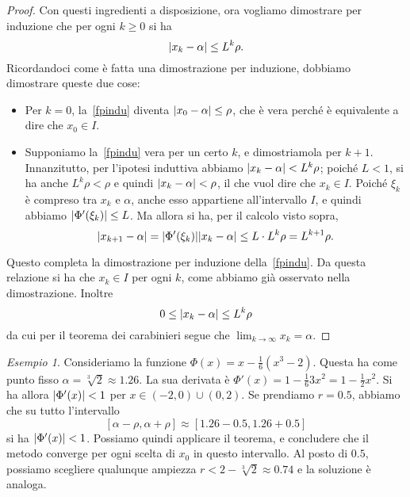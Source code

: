 \documentclass[a4paper]{report}
\DeclarePairedDelimiter{\abs}{\lvert}{\rvert}
\theoremstyle{definiton}
\theoremstyle{remark}
\newtheorem{esempio}[theorem]{Esempio}
\begin{document}
\begin{proof}
Con questi ingredienti a disposizione, ora vogliamo dimostrare per induzione che per ogni $k\geq 0$ si ha
\begin{equation} \label{fpindu}
    \abs{x_k - \alpha} \leq L^k \rho.
\end{equation}
Ricordandoci come è fatta una dimostrazione per induzione, dobbiamo dimostrare queste due cose:
\begin{itemize}
    \item Per $k=0$, la~\eqref{fpindu} diventa $\abs{x_0 - \alpha} \leq \rho$, che è vera perché è equivalente a dire che $x_0 \in I$. 
    \item Supponiamo la~\eqref{fpindu} vera per un certo $k$, e dimostriamola per $k+1$. Innanzitutto, per l'ipotesi induttiva abbiamo $\abs{x_k - \alpha} < L^k \rho$; poiché $L<1$, si ha anche $L^k\rho < \rho$ e quindi $\abs{x_k - \alpha}<\rho$, il che vuol dire che $x_k\in I$. Poiché $\xi_k$ è compreso tra $x_k$ e $\alpha$, anche esso appartiene all'intervallo $I$, e quindi abbiamo $\abs{\Phi'(\xi_k)} \leq L$. Ma allora si ha, per il calcolo visto sopra, 
    \begin{equation} \label{fpindu2}
        \abs{x_{k+1} - \alpha} = \abs{\Phi'(\xi_k)} \abs{x_k - \alpha} \leq L \cdot L^k \rho = L^{k+1}\rho.
    \end{equation}  
\end{itemize}
Questo completa la dimostrazione per induzione della~\eqref{fpindu}. Da questa relazione si ha che $x_k \in I$ per ogni $k$, come abbiamo già osservato nella dimostrazione. Inoltre
\[
0 \leq \abs{x_k - \alpha} \leq L^k \rho
\]
da cui per il teorema dei carabinieri segue che $\lim_{k\to \infty} x_k = \alpha$.
\end{proof}

\begin{esempio}
Consideriamo la funzione $\Phi(x) = x - \frac16 (x^3-2)$. Questa ha come punto fisso $\alpha =\sqrt[3]{2} \approx 1.26$. La sua derivata è $\Phi'(x) = 1 - \frac{1}{6}3x^2 = 1 - \frac{1}{2}x^2$. Si ha allora $\abs{\Phi'(x)}<1$ per $x \in (-2,0) \cup (0,2)$. Se prendiamo $r = 0.5$, abbiamo che su tutto l'intervallo
\[
    [\alpha-\rho,\alpha+\rho] \approx [1.26-0.5,1.26+0.5]
\]
si ha $\abs{\Phi'(x)}<1$. Possiamo quindi applicare il teorema, e concludere che il metodo converge per ogni scelta di $x_0$ in questo intervallo. Al posto di $0.5$, possiamo scegliere qualunque ampiezza $r < 2 - \sqrt[3]{2} \approx 0.74$ e la soluzione è analoga.
\end{esempio} 
\end{document}
